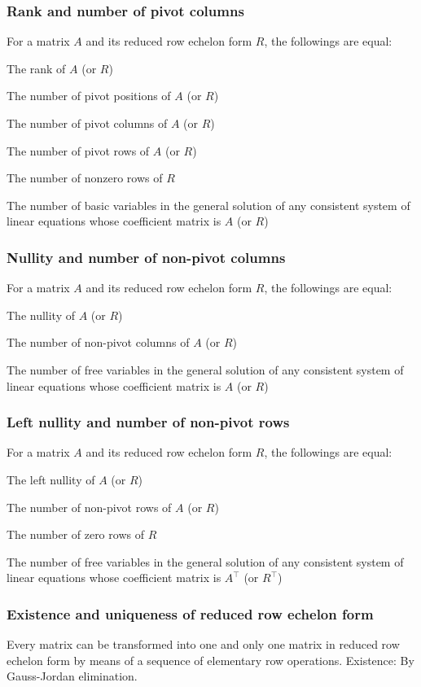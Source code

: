 \documentclass[a4paper,12pt]{report}
\begin{document}
\subsubsection{Rank and number of pivot columns}
For a matrix $A$ and its reduced row echelon form $R$, the followings are equal:
\bit
\item The rank of $A$ (or $R$)
\item The number of pivot positions of $A$ (or $R$)
\item The number of pivot columns of $A$ (or $R$)
\item The number of pivot rows of $A$ (or $R$)
\item The number of nonzero rows of $R$
\item The number of basic variables in the general solution of any consistent system of linear equations whose coefficient matrix is $A$ (or $R$)
\eit
\subsubsection{Nullity and number of non-pivot columns}
For a matrix $A$ and its reduced row echelon form $R$, the followings are equal:
\bit
\item The nullity of $A$ (or $R$)
\item The number of non-pivot columns of $A$ (or $R$)
\item The number of free variables in the general solution of any consistent system of linear equations whose coefficient matrix is $A$ (or $R$)
\eit
\subsubsection{Left nullity and number of non-pivot rows}
For a matrix $A$ and its reduced row echelon form $R$, the followings are equal:
\bit
\item The left nullity of $A$ (or $R$)
\item The number of non-pivot rows of $A$ (or $R$)
\item The number of zero rows of $R$
\item The number of free variables in the general solution of any consistent system of linear equations whose coefficient matrix is $A^\top$ (or $R^{\top}$)
\eit
\subsubsection{Existence and uniqueness of reduced row echelon form}
Every matrix can be transformed into one and only one matrix in reduced row echelon form by means of a sequence of elementary row operations.
\bpr
Existence: By Gauss-Jordan elimination.
\end{document}
